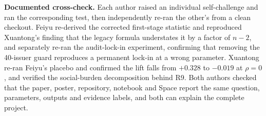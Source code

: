 \textbf{Documented cross-check.} Each author raised an individual self-challenge and ran the corresponding test, then independently re-ran the other's from a clean checkout. Feiyu re-derived the corrected first-stage statistic and reproduced Xuantong's finding that the legacy formula understates it by a factor of $n-2$, and separately re-ran the audit-lock-in experiment, confirming that removing the 40-issuer guard reproduces a permanent lock-in at a wrong parameter. Xuantong re-ran Feiyu's placebo and confirmed the lift falls from $+0.328$ to $-0.019$ at $\rho=0$, and verified the social-burden decomposition behind R9. Both authors checked that the paper, poster, repository, notebook and Space report the same question, parameters, outputs and evidence labels, and both can explain the complete project.


\appendix

